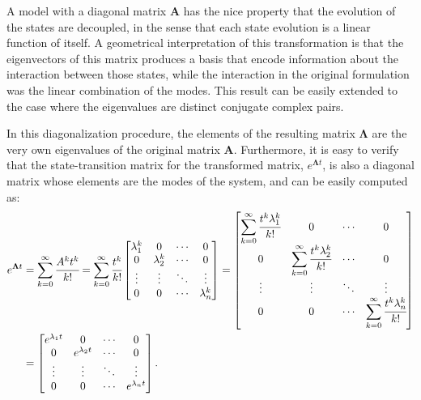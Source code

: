 \documentclass[a4paper,11pt]{book}
\numberwithin{figure}{chapter}
\numberwithin{equation}{chapter}
\numberwithin{table}{chapter}
\theoremstyle{definition}
\begin{document}
A model with a diagonal matrix $\bm{A}$ has the nice property that the evolution of the states are decoupled, in the sense that each state evolution is a linear function of itself. A geometrical interpretation of this transformation is that the eigenvectors of this matrix produces a basis that encode information about the interaction between those states, while the interaction in the original formulation was the linear combination of the modes. This result can be easily extended to the case where the eigenvalues are distinct conjugate complex pairs.

In this diagonalization procedure, the elements of the resulting matrix $\bm{\Lambda}$ are the very own eigenvalues of the original matrix $\bm{A}$. Furthermore, it is easy to verify that the state-transition matrix for the transformed matrix, $e^{\bm{\Lambda} t}$, is also a diagonal matrix whose elements are the modes of the system, and can be easily computed as:
\begin{align}
\begin{split}
    e^{\bm{\Lambda} t} & = \sum_{k=0}^{\infty} \cfrac{A^k t^k}{k!   }  = \sum_{k=0}^{\infty} \cfrac{t^k}{k!} \begin{bmatrix} \lambda_1^k & 0 & \cdots & 0 \\ 0 & \lambda_2^k & \cdots & 0 \\ \vdots & \vdots & \ddots & \vdots \\ 0 & 0 & \cdots & \lambda_n^k  \end{bmatrix} = \begin{bmatrix} \displaystyle\sum_{k=0}^{\infty} \cfrac{t^k\lambda_1^k}{k!} & 0 & \cdots & 0 \\ 0 & \displaystyle\sum_{k=0}^{\infty} \cfrac{t^k\lambda_2^k}{k!} & \cdots & 0 \\ \vdots & \vdots & \ddots & \vdots \\ 0 & 0 & \cdots & \displaystyle\sum_{k=0}^{\infty} \cfrac{t^k\lambda_n^k}{k!} \end{bmatrix} \\ 
    &= \begin{bmatrix} e^{\lambda_1 t} & 0 & \cdots & 0 \\ 0 & e^{\lambda_2 t} & \cdots & 0 \\ \vdots & \vdots & \ddots & \vdots \\ 0 & 0 & \cdots & e^{\lambda_n t} \end{bmatrix} .
\end{split}
\end{align}
\end{document}
